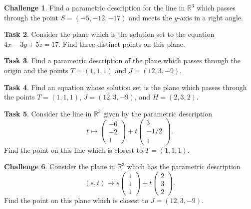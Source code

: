 \documentclass{tufte-book}
\theoremstyle{definition}
\newtheorem{task}{Task}
\newtheorem{challenge}[task]{Challenge}
\begin{document}
\begin{challenge}
Find a parametric description for the line in $\mathbb{R}^3$ which passes through the point $S = (-5,-12,-17)$ and meets the $y$-axis in a right angle.
\end{challenge}

\begin{task}
Consider the plane which is the solution set to the equation
$4x-3y+5z=17$. Find three distinct points on this plane.
\end{task}


\begin{task}
Find a parametric description of the plane which passes through the origin and the points $T = (1,1,1)$ and $J = (12,3,-9)$.
\end{task}


\begin{task}
Find an equation whose solution set is the plane which passes through the points $T = (1,1,1)$, $J = (12,3,-9)$, and $H = (2,3,2)$.
\end{task}


\begin{task}
Consider the line in $\mathbb{R}^3$ given by the parametric description
\[
t \mapsto \begin{pmatrix} -6\\-2\\1 \end{pmatrix} + t \begin{pmatrix} 3\\-1/2\\1\end{pmatrix}.
\]
Find the point on this line which is closest to $T = (1,1,1)$.
\end{task}


\begin{challenge}
Consider the plane in $\mathbb{R}^3$ which has the parametric description
\[
(s,t) \mapsto s\begin{pmatrix} 1\\1\\1\end{pmatrix} + t \begin{pmatrix} 2\\3\\2\end{pmatrix}. 
\]
Find the point on this plane which is closest to $J = (12,3,-9)$.
\end{challenge}
\end{document}
